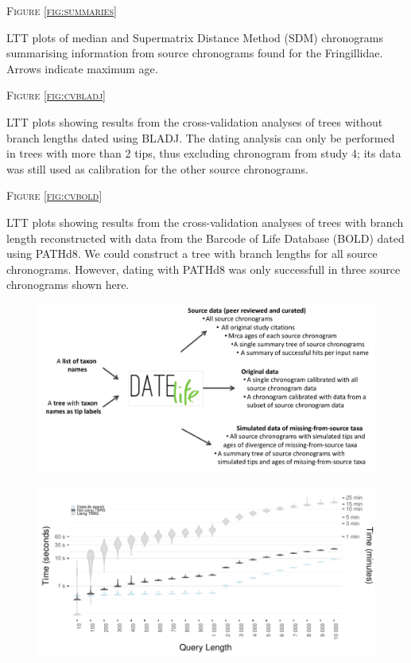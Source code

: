 \documentclass[]{article}
\begin{document}
\begin{center}
\textsc{Figure \ref{fig:summaries}}
\end{center}
LTT plots of median and Supermatrix Distance Method (SDM) chronograms summarising information from source chronograms found for the Fringillidae. Arrows indicate maximum age.

\begin{center}
\textsc{Figure \ref{fig:cvbladj}}
\end{center}
LTT plots showing results from the cross-validation analyses of trees without branch lengths dated using BLADJ. The dating analysis can only be performed in trees with more than 2 tips, thus excluding chronogram from study 4; its data was still used as calibration for the other source chronograms.

\begin{center}
\textsc{Figure \ref{fig:cvbold}}
\end{center}
LTT plots showing results from the cross-validation analyses of trees with branch length reconstructed with data from the Barcode of Life Database (BOLD) dated using PATHd8. We could construct a tree with branch lengths for all source chronograms. However, dating with PATHd8 was only successfull in three source chronograms shown here.

\newpage

\begin{figure}[!h]
\includegraphics{Fig1.pdf}
\caption{}
\label{fig:workflow}
\end{figure}

\newpage

\begin{figure}[!h]
\includegraphics[width=1\linewidth]{fig_runtime1.pdf}
\caption{}
\label{fig:runtime1}
\end{figure}
\end{document}
